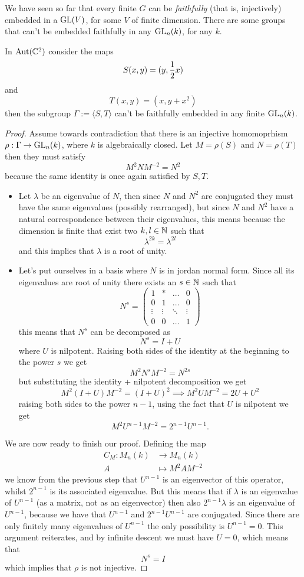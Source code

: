 \documentclass[11pt]{scrartcl}
\begin{document}
	We have seen so far that every finite $G$ can be \textit{faithfully} (that is, injectively) embedded in a $\operatorname{GL}(V)$, for some $V$ of finite dimension. There are some groups that can't be  embedded faithfully in any $\operatorname{GL}_n(k)$, for any $k$.
	\begin{theorem}[Mathieu, 2023]
		In $\text{Aut}(\mathbb C^2)$ consider the maps
		$$S(x,y)=(y,\frac{1}{2} x)$$
		and 
		$$T(x,y)=(x,y+x^2)$$
		then the subgroup $\Gamma:=\langle S,T\rangle$ can't be faithfully embedded in any finite $\operatorname{GL}_n(k)$.
	\end{theorem}
	\begin{proof}
		Assume towards contradiction that there is an injective homomoprhism $\rho:\Gamma\to \operatorname{GL}_n(k)$, where $k$ is algebraically closed. Let $M=\rho(S)$ and $N=\rho(T)$ then they must satisfy
		$$M^{2}NM^{-2}=N^2$$
		because the same identity is once again satisfied by $S,T$.
		\begin{itemize}
			\item[\textbf{Step 1}:] Let $\lambda$ be an eigenvalue of $N$, then since $N$ and $N^2$ are conjugated they must have the same eigenvalues (possibly rearranged), but since $N$ and $N^2$ have a natural correspondence between their eigenvalues, this means because the dimension is finite that exist two $k,l\in\mathbb N$ such that
			$$\lambda^{2k}=\lambda^{2l}$$
			and this implies that $\lambda$ is a root of unity.
			\item[\textbf{Step 2}:] Let's put ourselves in a basis where $N$ is in jordan normal form. Since all its eigenvalues are root of unity there exists an $s\in\mathbb N$ such that
			$$N^s=\begin{pmatrix}
				1 & * & \dots & 0 \\
				0 & 1 & \dots & 0 \\
				\vdots & \vdots & \ddots & \vdots \\
				0 & 0 & \dots & 1
			\end{pmatrix}$$
			this means that $N^s$ can be decomposed as
			$$N^s=I+U$$
			where $U$ is nilpotent. Raising both sides of the identity at the beginning to the power $s$ we get
			$$M^2N^sM^{-2}=N^{2s}$$
			but substituting the identity + nilpotent decomposition we get
			$$M^2(I+U)M^{-2}=(I+U)^2 \implies M^2UM^{-2}=2U+U^2$$
			raising both sides to the power $n-1$, using the fact that $U$ is nilpotent we get
			$$M^2U^{n-1}M^{-2}=2^{n-1}U^{n-1}.$$
		\end{itemize}
		We are now ready to finish our proof. Defining the map
		\begin{align*}
			C_M:M_n(k) & \to M_n(k) \\
			A & \mapsto M^2AM^{-2}
		\end{align*}
		we know from the previous step that $U^{n-1}$ is an eigenvector of this operator, whilst $2^{n-1}$ is its associated eigenvalue. But this means that if $\lambda$ is an eigenvalue of $U^{n-1}$ (as a matrix, not as an eigenvector) then also $2^{n-1}\lambda$ is an eigenvalue of $U^{n-1}$, because we have that $U^{n-1}$ and $2^{n-1}U^{n-1}$ are conjugated. Since there are only finitely many eigenvalues of $U^{n-1}$ the only possibility is $U^{n-1}=0$. This argument reiterates, and by infinite descent we must have $U=0$, which means that
		$$N^s=I$$
		which implies that $\rho$ is not injective.
	\end{proof}
\end{document}
